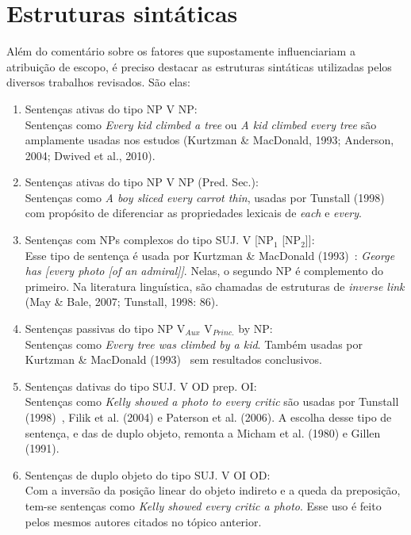\section{Estruturas sintáticas}
Além do comentário sobre os fatores que supostamente influenciariam a atribuição de escopo, é preciso destacar as estruturas sintáticas utilizadas pelos diversos trabalhos revisados. São elas:

\begin{enumerate}
    \item Sentenças ativas do tipo NP V NP:\\
    Sentenças como \emph{Every kid climbed a tree} ou \emph{A kid climbed every tree} são amplamente usadas nos estudos (Kurtzman \& MacDonald, 1993; Anderson, 2004; Dwived et al., 2010).
    \item Sentenças ativas do tipo NP V NP (Pred. Sec.):\\
    Sentenças como \emph{A boy sliced every carrot thin}, usadas por Tunstall (1998)~\cite{Tunstall1998} com propósito de diferenciar as propriedades lexicais de \emph{each} e \emph{every}.
    \item Sentenças com NPs complexos do tipo SUJ. V [NP$_1$ [NP$_2$]]:\\
    Esse tipo de sentença é usada por Kurtzman \& MacDonald (1993)~\cite{KMac1993}: \emph{George has [every photo [of an admiral]]}. Nelas, o segundo NP é complemento do primeiro. Na literatura linguística, são chamadas de estruturas de \emph{inverse link} (May \& Bale, 2007; Tunstall, 1998: 86).
    \item Sentenças passivas do tipo NP V$_{Aux}$ V$_{Princ.}$ by NP:\\
    Sentenças como \emph{Every tree was climbed by a kid}. Também usadas por Kurtzman \& MacDonald (1993)~\cite{KMac1993} sem resultados conclusivos.
    \item Sentenças dativas do tipo SUJ. V OD prep. OI: \\
    Sentenças como \emph{Kelly showed a photo to every critic} são usadas por Tunstall (1998)~\cite{Tunstall1998}, Filik et al. (2004) e Paterson et al. (2006). A escolha desse tipo de sentença, e das de duplo objeto, remonta a Micham et al. (1980) e Gillen (1991).
    \item Sentenças de duplo objeto do tipo SUJ. V OI OD: \\
    Com a inversão da posição linear do objeto indireto e a queda da preposição, tem-se sentenças como \emph{Kelly showed every critic a photo}. Esse uso é feito pelos mesmos autores citados no tópico anterior.
\end{enumerate}

